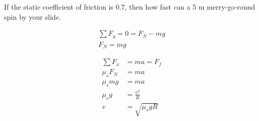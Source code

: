 \begin{problem}
	If the static coefficient of friction is 0.7, then how fast can a 5 m merry-go-round spin by your slide. 

	$$
	\begin{aligned}
		\sum F_y = 0 = F_N - mg\\
		F_N = mg
	\end{aligned}
	$$

	$$
	\begin{aligned}
		\sum F_x &= ma = F_f\\
		\mu_sF_N &= ma\\
		\mu_smg &= ma\\
		\mu_sg &= \frac{v^2}{R}\\
		v &= \sqrt{\mu_sgR}
	\end{aligned}
	$$
\end{problem}